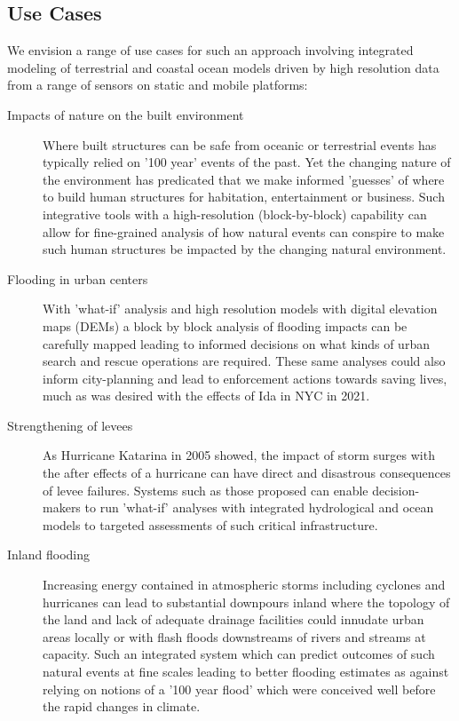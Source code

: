 \subsection*{Use Cases}

We envision a range of use cases for such an approach involving
integrated modeling of terrestrial and coastal ocean models driven by
high resolution data from a range of sensors on static and mobile
platforms: 

\begin{description}

  
\item[Impacts of nature on the built environment] Where built structures
  can be safe from oceanic or terrestrial events has typically relied on
  '100 year' events of the past. Yet the changing nature of the
  environment has predicated that we make informed 'guesses' of where to
  build human structures for habitation, entertainment or business. Such
  integrative tools with a high-resolution (block-by-block) capability
  can allow for fine-grained analysis of how natural events can conspire
  to make such human structures be impacted by the changing natural
  environment. 

\item[Flooding in urban centers] With 'what-if' analysis and high
  resolution models with digital elevation maps (DEMs) a block by block
  analysis of flooding impacts can be carefully mapped leading to
  informed decisions on what kinds of urban search and rescue operations
  are required. These same analyses could also inform city-planning and
  lead to enforcement actions towards saving lives, much as was desired
  with the effects of Ida in NYC in 2021.

\item[Strengthening of levees] As Hurricane Katarina in 2005 showed, the
  impact of storm surges with the after effects of a hurricane can have
  direct and disastrous consequences of levee failures. Systems such as
  those proposed can enable decision-makers to run 'what-if' analyses
  with integrated hydrological and ocean models to targeted assessments
  of such critical infrastructure.

\item[Inland flooding] Increasing energy contained in atmospheric storms
  including cyclones and hurricanes can lead to substantial downpours
  inland where the topology of the land and lack of adequate drainage
  facilities could innudate urban areas locally or with flash floods
  downstreams of rivers and streams at capacity. Such an integrated
  system which can predict outcomes of such natural events at fine
  scales leading to better flooding estimates as against relying on
  notions of a '100 year flood' which were conceived well before the
  rapid changes in climate. 


\end{description}

